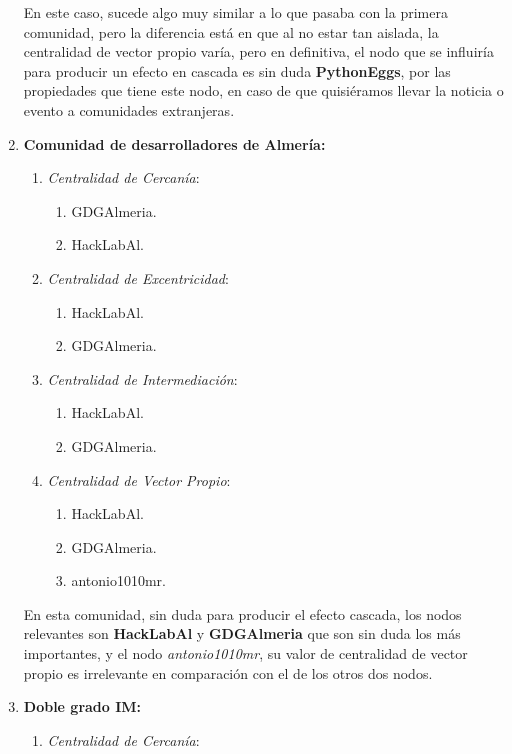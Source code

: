 \documentclass[paper=a4, fontsize=11pt]{article} %
\numberwithin{equation}{section} %
\numberwithin{figure}{section} %
\numberwithin{table}{section} %
\begin{document}
\begin{enumerate}[$\bullet$]
\begin{enumerate}[---]
  \end{enumerate}
  En este caso, sucede algo muy similar a lo que pasaba con la primera comunidad, pero la diferencia está en que al no estar tan aislada, la centralidad de vector propio varía, pero en definitiva, el nodo que se influiría para producir un efecto en cascada es sin duda \textbf{PythonEggs}, por las propiedades que tiene este nodo, en caso de que quisiéramos llevar la noticia o evento a comunidades extranjeras.
  \item \textbf{Comunidad de desarrolladores de Almería:}
  \begin{enumerate}[---]
    \item \textit{Centralidad de Cercanía}:
    \begin{enumerate}
      \item GDGAlmeria.
      \item HackLabAl.
    \end{enumerate}
    \item \textit{Centralidad de Excentricidad}:
    \begin{enumerate}
      \item HackLabAl.
      \item GDGAlmeria.
    \end{enumerate}
    \item \textit{Centralidad de Intermediación}:
    \begin{enumerate}
      \item HackLabAl.
      \item GDGAlmeria.
    \end{enumerate}
    \item \textit{Centralidad de Vector Propio}:
    \begin{enumerate}
      \item HackLabAl.
      \item GDGAlmeria.
      \item antonio1010mr.
    \end{enumerate}
  \end{enumerate}
  En esta comunidad, sin duda para producir el efecto cascada, los nodos relevantes son \textbf{HackLabAl} y \textbf{GDGAlmeria} que son sin duda los más importantes, y el nodo \textit{antonio1010mr}, su valor de centralidad de vector propio es irrelevante en comparación con el de los otros dos nodos.
  \item \textbf{Doble grado IM:}
  \begin{enumerate}[---]
    \item \textit{Centralidad de Cercanía}:

\end{enumerate}
\end{enumerate}
\end{document}
